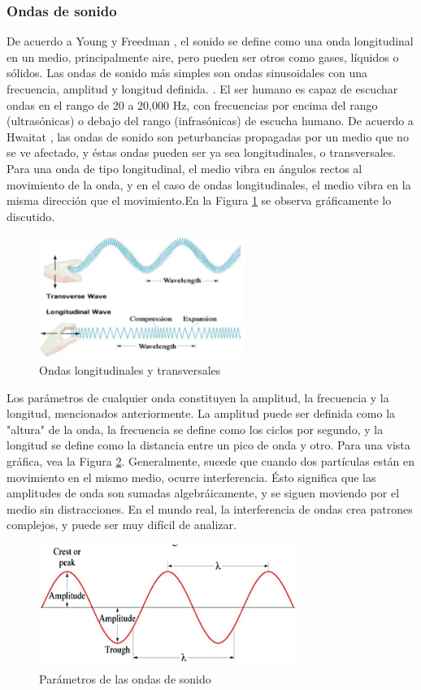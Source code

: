\documentclass[12pt, letterpaper]{article}
\begin{document}
\subsubsection{Ondas de sonido}
De acuerdo a Young y Freedman \cite{university-physics}, el sonido se define como una onda 
longitudinal en un medio, principalmente aire, pero pueden ser otros como gases, líquidos o sólidos. Las 
ondas de sonido más simples son ondas sinusoidales con una frecuencia, amplitud y longitud definida. 
\cite{university-physics}. El ser humano es capaz de escuchar ondas en el rango de 20 a 20,000 Hz, con 
frecuencias por encima del rango (ultrasónicas) o debajo del rango (infrasónicas) de escucha humano. 
De acuerdo a Hwaitat \cite{frequencies-wave-sound-pso}, las ondas de sonido son peturbancias propagadas por un medio que 
no se ve afectado, y éstas ondas pueden ser ya sea longitudinales, o transversales. Para una onda 
de tipo longitudinal, el medio vibra en ángulos rectos al movimiento de la onda, y en el caso de ondas longitudinales, 
el medio vibra en la misma dirección que el movimiento.En la Figura \ref*{Ondas Longitudinales} se observa gráficamente lo discutido. 
\begin{figure}[H]
  \centering
  \includegraphics[height = 4cm]{imgs/investigacion/ondas_longitudinales_transversales.png}
  \caption{Ondas longitudinales y transversales}
  \label{Ondas Longitudinales}
\end{figure}
Los parámetros de cualquier onda constituyen la amplitud, la frecuencia 
y la longitud, mencionados anteriormente. La amplitud puede ser definida como la "altura" 
de la onda, la frecuencia se define como los ciclos por segundo, y la longitud se define como la distancia 
entre un pico de onda y otro. Para una vista gráfica, vea la Figura \ref*{parametros-ondas}. Generalmente, sucede que 
cuando dos partículas están en movimiento en el mismo medio, ocurre interferencia. Ésto significa que 
las amplitudes de onda son sumadas algebráicamente, y se siguen moviendo por el medio sin distracciones. En el mundo real, 
la interferencia de ondas crea patrones complejos, y puede ser muy difícil de analizar.  
\begin{figure}[H]
  \centering
  \includegraphics[height = 4cm]{imgs/investigacion/parametros-ondas.png}
  \caption{Parámetros de las ondas de sonido}
  \label{parametros-ondas}
\end{figure}
\end{document}
